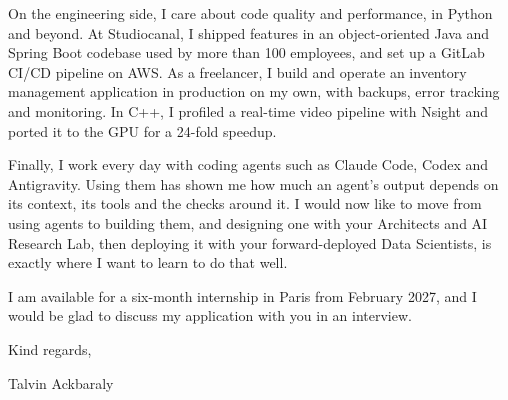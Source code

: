 \documentclass[11pt, a4paper]{extarticle}
\begin{document}
On the engineering side, I care about code quality and performance, in Python and beyond. At
Studiocanal, I shipped features in an object-oriented Java and Spring Boot codebase used by more
than 100 employees, and set up a GitLab CI/CD pipeline on AWS. As a freelancer, I build and operate
an inventory management application in production on my own, with backups, error tracking and
monitoring. In C++, I profiled a real-time video pipeline with Nsight and ported it to the GPU for a
24-fold speedup.

Finally, I work every day with coding agents such as Claude Code, Codex and Antigravity. Using them
has shown me how much an agent's output depends on its context, its tools and the checks around it.
I would now like to move from using agents to building them, and designing one with your Architects
and AI Research Lab, then deploying it with your forward-deployed Data Scientists, is exactly where
I want to learn to do that well.

I am available for a six-month internship in Paris from February 2027, and I would be glad to
discuss my application with you in an interview.

\vspace{4pt}
Kind regards,

\vspace{10pt}
\hfill Talvin Ackbaraly\hspace*{1cm}
\end{document}
